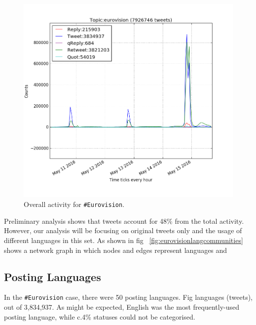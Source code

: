 \documentclass{llncs}
\begin{document}
\begin{figure}[htb]
\centering
\includegraphics[width=\columnwidth]{images/overalleurovisionactivity.png}
\caption{Overall activity for {\texttt{\#Eurovision}}.}
\label{fig:overalleurovisionactivity}
\end{figure}

Preliminary analysis shows that tweets account
for 48\% from the total activity. However, our analysis will be focusing on
original tweets only and the usage of different languages in this set. As shown in 
fig ~\ref{fig:eurovisionlangcommunities} shows a network graph in which nodes and edges 
represent languages and 

\subsection{Posting Languages}\label{eurovisionpostinglangs}

In the {\texttt{\#Eurovision}} case, there were 50 posting
languages. Fig
languages (tweets), out of 3,834,937. As might be expected, English
was the most frequently-used posting language, while c.4\% statuses
could not be categorised.
\end{document}
